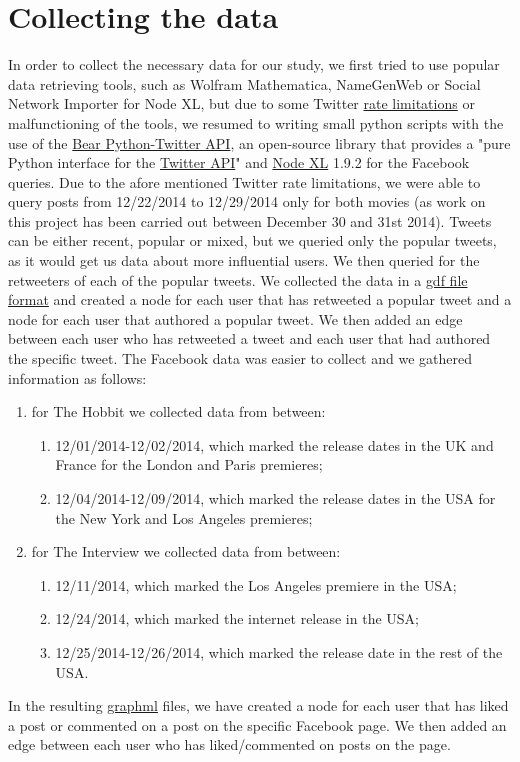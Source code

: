 \documentclass{llncs}
\begin{document}
\section{Collecting the data}
In order to collect the necessary data for our study, we first tried to use
popular data retrieving tools, such as Wolfram Mathematica, NameGenWeb or Social
Network Importer for Node XL, but due to some Twitter
\href{https://dev.twitter.com/rest/public/rate-limiting}{rate limitations} or
malfunctioning of the tools, we resumed to writing small python scripts with the
use of the \href{https://github.com/bear/python-twitter}{Bear Python-Twitter
API}, an open-source library that provides a "pure Python interface for the
\href{https://dev.twitter.com/rest/public}{Twitter API}" and
\href{http://nodexl.codeplex.com/}{Node XL} 1.9.2 for
the Facebook queries. Due to the afore mentioned Twitter rate limitations, we
were able to query posts from 12/22/2014 to 12/29/2014 only for both movies (as
work on this project has been carried out between December 30 and 31st 2014).
Tweets can be either recent, popular or mixed, but we queried only the
popular tweets, as it would get us data about more influential users. We then
queried for the retweeters of each of the popular tweets. We collected the data
in a \href{https://gephi.org/users/supported-graph-formats/gdf-format/}{gdf file
format} and created a node for each user that has retweeted a popular tweet and
a node for each user that authored a popular tweet. We then added an edge
between each user who has retweeted a tweet and each user that had authored the
specific tweet. The Facebook data was easier to collect and we gathered
information as follows:
\begin{enumerate}
\item for The Hobbit we collected data from between:
    \begin{enumerate}
    \item 12/01/2014-12/02/2014, which marked the release dates in the UK and
        France for the London and Paris premieres;
    \item 12/04/2014-12/09/2014, which marked the release dates in the USA for
        the New York and Los Angeles premieres;
    \end{enumerate}
\item for The Interview we collected data from between:
    \begin{enumerate}
    \item 12/11/2014, which marked the Los Angeles premiere in the USA;
    \item 12/24/2014, which marked the internet release in the USA;
    \item 12/25/2014-12/26/2014, which marked the release date in the rest of
        the USA.
    \end{enumerate}
\end{enumerate}
In the resulting \href{http://graphml.graphdrawing.org/}{graphml} files, we have
created a node for each user that has liked a post or commented on a post on the
specific Facebook page. We then added an edge between each user who has
liked/commented on posts on the page.
%
\end{document}
